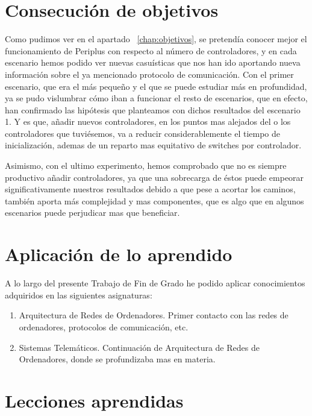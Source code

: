 \documentclass[a4paper, 12pt]{book}
\begin{document}
	\section{Consecución de objetivos}
	\label{sec:consecucion-objetivos}
	
	Como pudimos ver en el apartado ~\ref{chap:objetivos}, se pretendía conocer mejor el funcionamiento de Periplus con respecto al número de controladores, y en cada escenario hemos podido ver nuevas casuísticas que nos han ido aportando nueva información sobre el ya mencionado protocolo de comunicación. Con el primer escenario, que era el más pequeño y el que se puede estudiar más en profundidad, ya se pudo vislumbrar cómo iban a funcionar el resto de escenarios, que en efecto, han confirmado las hipótesis que planteamos con dichos resultados del escenario 1. Y es que, añadir nuevos controladores, en los puntos mas alejados del o los controladores que tuviésemos, va a reducir considerablemente el tiempo de inicialización, ademas de un reparto mas equitativo de switches por controlador.
	
	Asimismo, con el ultimo experimento, hemos comprobado que no es siempre productivo añadir controladores, ya que una sobrecarga de éstos puede empeorar significativamente nuestros resultados debido a que pese a acortar los caminos, también aporta más complejidad y mas componentes, que es algo que en algunos escenarios puede perjudicar mas que beneficiar.
	
	\section{Aplicación de lo aprendido}
	\label{sec:aplicacion}
	A lo largo del presente Trabajo de Fin de Grado he podido aplicar conocimientos adquiridos en las siguientes asignaturas: 
	\begin{enumerate}
		\item Arquitectura de Redes de Ordenadores. Primer contacto con las redes de ordenadores, protocolos de comunicación, etc.
		\item Sistemas Telemáticos. Continuación de Arquitectura de Redes de Ordenadores, donde se profundizaba mas en materia.
	\end{enumerate}
	
	
	\section{Lecciones aprendidas}
	\label{sec:lecciones_aprendidas}
	
\end{document}
